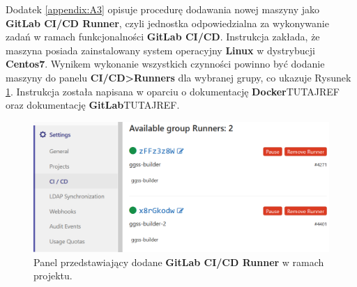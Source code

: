 Dodatek \ref{appendix:A3} opisuje procedurę dodawania nowej maszyny jako \textbf{GitLab CI/CD Runner}, czyli jednostka odpowiedzialna za wykonywanie zadań w ramach funkcjonalności \textbf{GitLab CI/CD}. Instrukcja zakłada, że maszyna posiada zainstalowany system operacyjny \textbf{Linux} w dystrybucji \textbf{Centos7}. Wynikem wykonanie wszystkich czynności powinno być dodanie maszyny do panelu \textbf{CI/CD>Runners} dla wybranej grupy, co ukazuje Rysunek \ref{fig:runner}. Instrukcja została napisana w oparciu o dokumentację \textbf{Docker}TUTAJREF oraz dokumentację \textbf{GitLab}TUTAJREF.

\begin{figure}
\caption{Panel przedstawiający dodane \textbf{GitLab CI/CD Runner} w ramach projektu.}
\label{fig:runner}
\includegraphics[width=\textwidth]{res/png/runnerAdded}
\end{figure}